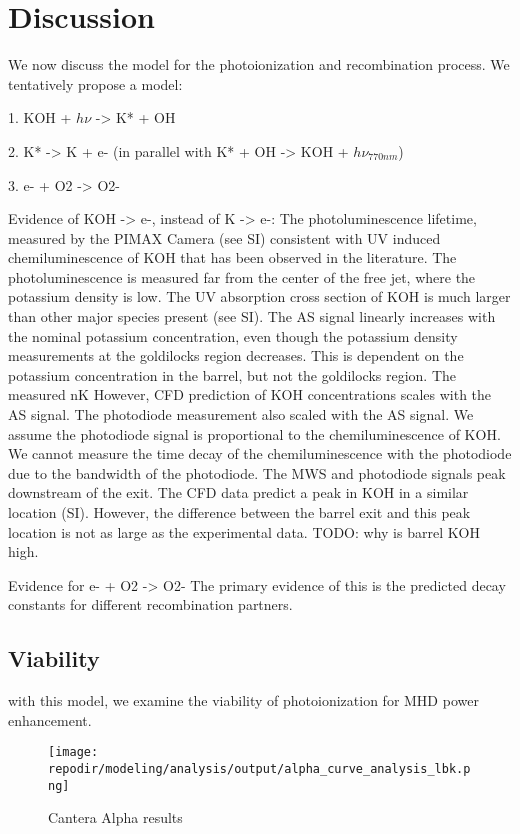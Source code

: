 \section{Discussion}

We now discuss the model for the photoionization and recombination process. We tentatively propose a model:

1. KOH + $h\nu$ -> K* + OH 

2. K* -> K + e- (in parallel with K* + OH -> KOH + $h\nu_{770 nm}$)

3. e- + O2 -> O2-



\begin{outline}
\1 Evidence of KOH -> e-, instead of K -> e-:
    \2 The photoluminescence lifetime, measured by the PIMAX Camera (see SI) consistent with UV induced chemiluminescence of KOH that has been observed in the literature. The photoluminescence is measured far from the center of the free jet, where the potassium density is low.
    \2 The UV absorption cross section of KOH is much larger than other major species present (see SI).
    \2 The AS signal linearly increases with the nominal potassium concentration, even though the potassium density measurements at the goldilocks region decreases. This   is dependent on the potassium concentration in the barrel, but not the goldilocks region. The measured nK However, CFD prediction of KOH concentrations scales with the AS signal. The photodiode measurement also scaled with the AS signal. We assume the photodiode signal is proportional to the chemiluminescence of KOH. We cannot measure the time decay of the chemiluminescence with the photodiode due to the bandwidth of the photodiode.
    \2 The MWS and photodiode signals peak downstream of the exit. The CFD data predict a peak in KOH in a similar location (SI). However, the difference between the barrel exit and this peak location is not as large as the experimental data. TODO: why is barrel KOH high. 

\1 Evidence for e- + O2 -> O2-
    \2 The primary evidence of this is the predicted decay constants for different recombination partners. 

\end{outline}



\subsection{Viability}

with this model, we examine the viability of photoionization for MHD power enhancement. 

\begin{figure}[h]
    \texttt{[image: \\repodir/modeling/analysis/output/alpha\_curve\_analysis\_lbk.png]}
    \caption{Cantera Alpha results}
\end{figure}
